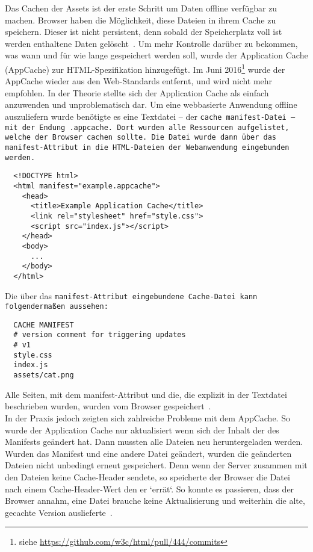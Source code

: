 Das Cachen der \gls{Assets} ist der erste Schritt um Daten offline verfügbar zu machen. Browser haben die Möglichkeit, diese Dateien in ihrem Cache zu speichern. Dieser ist nicht persistent, denn sobald der Speicherplatz voll ist werden enthaltene Daten gelöscht~\cite{cache}.
%
%
Um mehr Kontrolle darüber zu bekommen, was wann und für wie lange gespeichert werden soll, wurde der Application Cache (AppCache) zur \gls{HTML}-Spezifikation hinzugefügt.
Im Juni 2016\footnote{siehe \url{https://github.com/w3c/html/pull/444/commits}} wurde der AppCache wieder aus den Web-Standards entfernt, und wird nicht mehr empfohlen.
In der Theorie stellte sich der Application Cache als einfach anzuwenden und unproblematisch dar. Um eine webbasierte Anwendung offline auszuliefern wurde benötigte es eine Textdatei -- der \tt{cache manifest}-Datei -- mit der Endung \tt{.appcache}. Dort wurden alle Ressourcen aufgelistet, welche der Browser cachen sollte.
Die Datei wurde dann über das \tt{manifest}-Attribut in die \gls{HTML}-Dateien der Webanwendung eingebunden werden.
%
\begin{lstlisting}
  <!DOCTYPE html>
  <html manifest="example.appcache">
    <head>
      <title>Example Application Cache</title>
      <link rel="stylesheet" href="style.css">
      <script src="index.js"></script>
    </head>
    <body>
      ...
    </body>
  </html>
\end{lstlisting}
%
Die über das \tt{manifest}-Attribut eingebundene Cache-Datei kann folgendermaßen aussehen:
\begin{lstlisting}
  CACHE MANIFEST
  # version comment for triggering updates
  # v1
  style.css
  index.js
  assets/cat.png
\end{lstlisting}
Alle Seiten, mit dem manifest-Attribut und die, die explizit in der Textdatei beschrieben wurden, wurden vom Browser gespeichert~\cite{appcache}.\\
In der Praxis jedoch zeigten sich zahlreiche Probleme mit dem AppCache. So wurde der Application Cache nur aktualisiert wenn sich der Inhalt der des Manifests geändert hat. Dann mussten alle Dateien neu heruntergeladen werden.
Wurden das Manifest und eine andere Datei geändert, wurden die geänderten Dateien nicht unbedingt erneut gespeichert. Denn wenn der Server zusammen mit den Dateien keine Cache-Header sendete, so speicherte der Browser die Datei nach einem Cache-Header-Wert den er `errät`. So konnte es passieren, dass der Browser annahm, eine Datei brauche keine Aktualisierung und weiterhin die alte, gecachte Version auslieferte~\cite{noappcache}.\\
